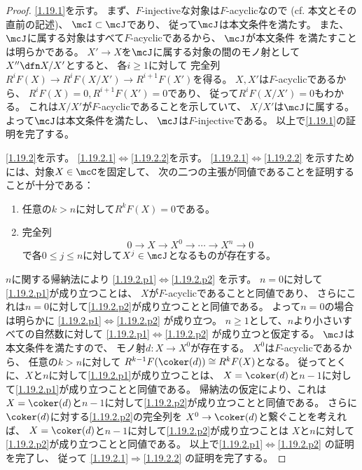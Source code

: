 \documentclass[uplatex,dvipdfmx]{jsarticle}
\begin{document}
\begin{proof}
  \ref{1.19.1}を示す。
  まず、\(F\)-injectiveな対象は\(F\)-acyclicなので
  (cf. 本文\cite[Proposition 1.8.3]{kashiwara2002sheaves}とその直前の記述)、
  \(\mcI\subset \mcJ\)であり、
  従って\(\mcJ\)は本文条件\cite[Definition 1.8.2 (i)]{kashiwara2002sheaves}を満たす。
  また、\(\mcJ\)に属する対象はすべて\(F\)-acyclicであるから、
  \(\mcJ\)が本文条件\cite[Definition 1.8.2 (ii)]{kashiwara2002sheaves}
  を満たすことは明らかである。
  \(X'\to X\)を\(\mcJ\)に属する対象の間のモノ射として
  \(X'' \dfn X/X'\)とすると、
  各\(i\geq 1\)に対して
  完全列\(R^iF(X)\to R^iF(X/X')\to R^{i+1}F(X')\)を得る。
  \(X,X'\)は\(F\)-acyclicであるから、
  \(R^iF(X)=0, R^{i+1}F(X')=0\)であり、
  従って\(R^iF(X/X')=0\)もわかる。
  これは\(X/X'\)が\(F\)-acyclicであることを示していて、
  \(X/X'\)は\(\mcJ\)に属する。
  よって\(\mcJ\)は本文条件\cite[Definition 1.8.2 (ii)]{kashiwara2002sheaves}を満たし、
  \(\mcJ\)は\(F\)-injectiveである。
  以上で\ref{1.19.1}の証明を完了する。

  \ref{1.19.2}を示す。
  \ref{1.19.2.1}\(\Leftrightarrow\)\ref{1.19.2.2}を示す。
  \ref{1.19.2.1}\(\Leftrightarrow\)\ref{1.19.2.2}
  を示すためには、対象\(X\in \mcC\)を固定して、
  次の二つの主張が同値であることを証明することが十分である：
  \begin{enumerate}[label=(\Alph*)]
    \item \label{1.19.2.p1}
    任意の\(k > n\)に対して\(R^kF(X) = 0\)である。
    \item \label{1.19.2.p2}
    完全列
    \[
    0 \to X \to X^0 \to \cdots \to X^n \to 0
    \]
    で各\(0\leq j\leq n\)に対して\(X^j\in \mcJ\)となるものが存在する。
  \end{enumerate}
  \(n\)に関する帰納法により
  \ref{1.19.2.p1}\(\Leftrightarrow\)\ref{1.19.2.p2}
  を示す。
  \(n=0\)に対して\ref{1.19.2.p1}が成り立つことは、
  \(X\)が\(F\)-acyclicであることと同値であり、
  さらにこれは\(n=0\)に対して\ref{1.19.2.p2}が成り立つことと同値である。
  よって\(n=0\)の場合は明らかに
  \ref{1.19.2.p1}\(\Leftrightarrow\)\ref{1.19.2.p2}
  が成り立つ。
  \(n\geq 1\)として、\(n\)より小さいすべての自然数に対して
  \ref{1.19.2.p1}\(\Leftrightarrow\)\ref{1.19.2.p2}
  が成り立つと仮定する。
  \(\mcJ\)は本文条件\cite[Definition 1.8.2 (i)]{kashiwara2002sheaves}を満たすので、
  モノ射\(d:X\to X^0\)が存在する。
  \(X^0\)は\(F\)-acyclicであるから、
  任意の\(k > n\)に対して
  \(R^{k-1}F(\coker(d)) \cong R^kF(X)\)となる。
  従ってとくに、\(X\)と\(n\)に対して\ref{1.19.2.p1}が成り立つことは、
  \(X=\coker(d)\)と\(n-1\)に対して\ref{1.19.2.p1}が成り立つことと同値である。
  帰納法の仮定により、これは
  \(X=\coker(d)\)と\(n-1\)に対して\ref{1.19.2.p2}が成り立つことと同値である。
  さらに\(\coker(d)\)に対する\ref{1.19.2.p2}の完全列を
  \(X^0\to \coker(d)\)と繋ぐことを考えれば、
  \(X=\coker(d)\)と\(n-1\)に対して\ref{1.19.2.p2}が成り立つことは
  \(X\)と\(n\)に対して\ref{1.19.2.p2}が成り立つことと同値である。
  以上で\ref{1.19.2.p1}\(\Leftrightarrow\)\ref{1.19.2.p2}
  の証明を完了し、
  従って
  \ref{1.19.2.1}\(\Rightarrow\)\ref{1.19.2.2}
  の証明を完了する。


\end{proof}
\end{document}

